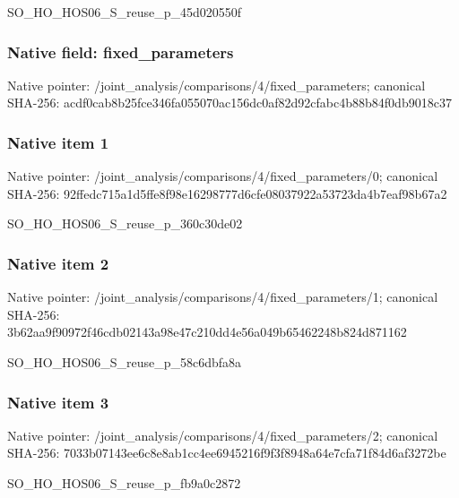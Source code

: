 \documentclass[10pt,a4paper]{article}
\begin{document}
\begingroup\raggedright\sloppy SO\_\allowbreak{}HO\_\allowbreak{}HOS06\_\allowbreak{}S\_\allowbreak{}reuse\_\allowbreak{}p\_\allowbreak{}45d020550f\par\endgroup

\subsubsection{Native field: fixed\_\allowbreak{}parameters}
Native pointer: /joint\_\allowbreak{}analysis/comparisons/4/fixed\_\allowbreak{}parameters; canonical SHA-256: acdf0cab8b25fce346fa055070ac156dc0af82d92cfabc4b88b84f0db9018c37

\subsubsection{Native item 1}
Native pointer: /joint\_\allowbreak{}analysis/comparisons/4/fixed\_\allowbreak{}parameters/0; canonical SHA-256: 92ffedc715a1d5ffe8f98e16298777d6cfe08037922a53723da4b7eaf98b67a2

\begingroup\raggedright\sloppy SO\_\allowbreak{}HO\_\allowbreak{}HOS06\_\allowbreak{}S\_\allowbreak{}reuse\_\allowbreak{}p\_\allowbreak{}360c30de02\par\endgroup

\subsubsection{Native item 2}
Native pointer: /joint\_\allowbreak{}analysis/comparisons/4/fixed\_\allowbreak{}parameters/1; canonical SHA-256: 3b62aa9f90972f46cdb02143a98e47c210dd4e56a049b65462248b824d871162

\begingroup\raggedright\sloppy SO\_\allowbreak{}HO\_\allowbreak{}HOS06\_\allowbreak{}S\_\allowbreak{}reuse\_\allowbreak{}p\_\allowbreak{}58c6dbfa8a\par\endgroup

\subsubsection{Native item 3}
Native pointer: /joint\_\allowbreak{}analysis/comparisons/4/fixed\_\allowbreak{}parameters/2; canonical SHA-256: 7033b07143ee6c8e8ab1cc4ee6945216f9f3f8948a64e7cfa71f84d6af3272be

\begingroup\raggedright\sloppy SO\_\allowbreak{}HO\_\allowbreak{}HOS06\_\allowbreak{}S\_\allowbreak{}reuse\_\allowbreak{}p\_\allowbreak{}fb9a0c2872\par\endgroup
\end{document}

